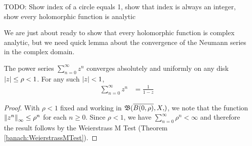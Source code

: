 TODO: Show index of a circle equals 1, show that index is always an integer, show every holomorphic function is analytic

We are just about ready to show that every holomorphic function is complex analytic, but we need quick lemma about the convergence of the Neumann series in the complex domain.

\begin{lem}\label{banach:ComplexNeumann}The power series $\sum_{n=0}^\infty z^n$ converges absolutely and uniformly on any disk $\left \vert z \right \vert \leq \rho < 1$.   For any such $\left \vert z \right \vert < 1$,
  \begin{align*}
    \sum_{n=0}^\infty z^n &= \frac{1}{1 - z}
  \end{align*}
\end{lem}
\begin{proof}
  With $\rho < 1$ fixed and working in $\sboundedfunctions{\overline{B(0, \rho)}, X}$, we note that the function $\left \lVert z^n \right \rVert_\infty \leq \rho^n$ for each $n \geq 0$.   Since $\rho < 1$, we have $\sum_{n=0}^\infty \rho^n < \infty$ and therefore the result follows by the Weierstrass M Test (Theorem \ref{banach:WeierstrassMTest}).
\end{proof}

